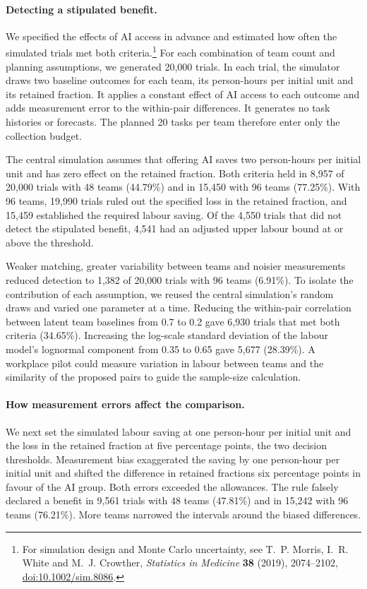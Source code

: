 \paragraph{Detecting a stipulated benefit.} We specified the effects of AI access in advance and estimated how often the simulated trials met both criteria.\footnote{For simulation design and Monte Carlo uncertainty, see T.~P. Morris, I.~R. White and M.~J. Crowther, \emph{Statistics in Medicine} \textbf{38} (2019), 2074--2102, \href{https://doi.org/10.1002/sim.8086}{doi:10.1002/sim.8086}.} For each combination of team count and planning assumptions, we generated 20,000 trials. In each trial, the simulator draws two baseline outcomes for each team, its person-hours per initial unit and its retained fraction. It applies a constant effect of AI access to each outcome and adds measurement error to the within-pair differences. It generates no task histories or forecasts. The planned 20 tasks per team therefore enter only the collection budget.

The central simulation assumes that offering AI saves two person-hours per initial unit and has zero effect on the retained fraction. Both criteria held in 8,957 of 20,000 trials with 48 teams (44.79\%) and in 15,450 with 96 teams (77.25\%). With 96 teams, 19,990 trials ruled out the specified loss in the retained fraction, and 15,459 established the required labour saving. Of the 4,550 trials that did not detect the stipulated benefit, 4,541 had an adjusted upper labour bound at or above the threshold.

Weaker matching, greater variability between teams and noisier measurements reduced detection to 1,382 of 20,000 trials with 96 teams (6.91\%). To isolate the contribution of each assumption, we reused the central simulation's random draws and varied one parameter at a time. Reducing the within-pair correlation between latent team baselines from 0.7 to 0.2 gave 6,930 trials that met both criteria (34.65\%). Increasing the log-scale standard deviation of the labour model's lognormal component from 0.35 to 0.65 gave 5,677 (28.39\%). A workplace pilot could measure variation in labour between teams and the similarity of the proposed pairs to guide the sample-size calculation.

\paragraph{How measurement errors affect the comparison.} We next set the simulated labour saving at one person-hour per initial unit and the loss in the retained fraction at five percentage points, the two decision thresholds. Measurement bias exaggerated the saving by one person-hour per initial unit and shifted the difference in retained fractions six percentage points in favour of the AI group. Both errors exceeded the allowances. The rule falsely declared a benefit in 9,561 trials with 48 teams (47.81\%) and in 15,242 with 96 teams (76.21\%). More teams narrowed the intervals around the biased differences.

